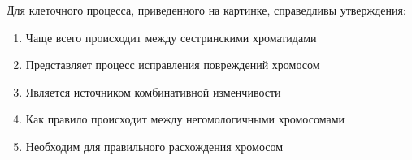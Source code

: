 
Для клеточного процесса,
приведенного на картинке, справедливы утверждения:


\begin{enumerate}
    \item Чаще всего происходит между сестринскими хроматидами
    \item Представляет процесс исправления повреждений хромосом
    \item Является источником комбинативной изменчивости
    \item Как правило происходит между негомологичными хромосомами
    \item Необходим для правильного расхождения хромосом
\end{enumerate}

